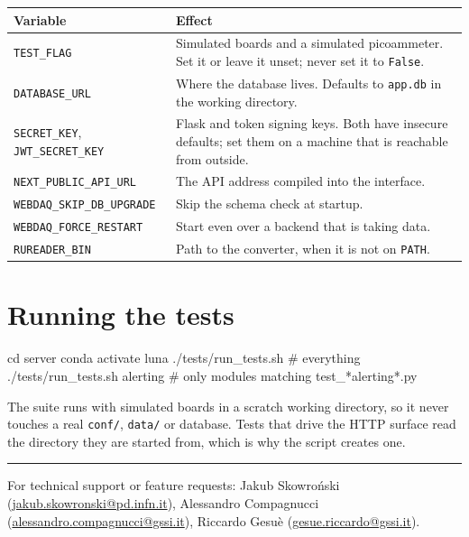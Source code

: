 \documentclass[11pt,a4paper]{report}
\newcommand{\cmd}[1]{\texttt{#1}}
\newcommand{\file}[1]{\texttt{#1}}
\begin{document}
\begin{center}
\begin{tabular}{@{}L{0.30\textwidth}L{0.62\textwidth}@{}}
\toprule
\textbf{Variable} & \textbf{Effect} \\
\midrule
\cmd{TEST\_FLAG} & Simulated boards and a simulated picoammeter. Set it or leave
it unset; never set it to \cmd{False}. \\
\cmd{DATABASE\_URL} & Where the database lives. Defaults to \file{app.db} in the
working directory. \\
\cmd{SECRET\_KEY}, \cmd{JWT\_SECRET\_KEY} & Flask and token signing keys. Both
have insecure defaults; set them on a machine that is reachable from outside. \\
\cmd{NEXT\_PUBLIC\_API\_URL} & The API address compiled into the interface. \\
\cmd{WEBDAQ\_SKIP\_DB\_UPGRADE} & Skip the schema check at startup. \\
\cmd{WEBDAQ\_FORCE\_RESTART} & Start even over a backend that is taking data. \\
\cmd{RUREADER\_BIN} & Path to the converter, when it is not on \cmd{PATH}. \\
\bottomrule
\end{tabular}
\end{center}

\chapter{Running the tests}

\begin{shell}
cd server
conda activate luna
./tests/run_tests.sh            # everything
./tests/run_tests.sh alerting   # only modules matching test_*alerting*.py
\end{shell}

The suite runs with simulated boards in a scratch working directory, so it never
touches a real \file{conf/}, \file{data/} or database. Tests that drive the HTTP
surface read the directory they are started from, which is why the script creates
one.

\vfill
\noindent\rule{\textwidth}{0.4pt}

\noindent\small For technical support or feature requests:
Jakub Skowroński (\href{mailto:jakub.skowronski@pd.infn.it}{jakub.skowronski@pd.infn.it}),
Alessandro Compagnucci (\href{mailto:alessandro.compagnucci@gssi.it}{alessandro.compagnucci@gssi.it}),
Riccardo Gesuè (\href{mailto:gesue.riccardo@gssi.it}{gesue.riccardo@gssi.it}).
\end{document}
